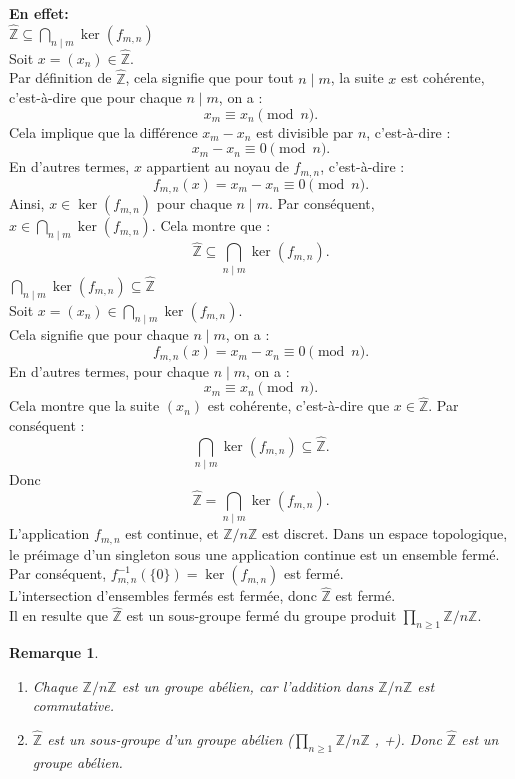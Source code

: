 \documentclass[a4paper, 14pt]{report}
\newtheorem{remark}{Remarque}[section]
\begin{document}
\begin{onehalfspace}
{\textbf{En effet:}\\
\( \widehat{\mathbb{Z}} \subseteq \bigcap_{n \mid m} \ker(f_{m,n}) \) \\
Soit \( x = (x_n) \in \widehat{\mathbb{Z}} \).\\
Par définition de \( \widehat{\mathbb{Z}} \), cela signifie que pour tout \( n \mid m \), la suite \( x \) est cohérente, c'est-à-dire que pour chaque \( n \mid m \), on a :
\[
x_m \equiv x_n \pmod{n}.
\]
Cela implique que la différence \( x_m - x_n \) est divisible par \( n \), c'est-à-dire :
\[
x_m - x_n \equiv 0 \pmod{n}.
\]
En d'autres termes, \( x \) appartient au noyau de \( f_{m,n} \), c'est-à-dire :
\[
f_{m,n}(x) = x_m - x_n \equiv 0 \pmod{n}.
\]
Ainsi, \( x \in \ker(f_{m,n}) \) pour chaque \( n \mid m \). Par conséquent, \( x \in \bigcap_{n \mid m} \ker(f_{m,n}) \). Cela montre que :
\[
\widehat{\mathbb{Z}} \subseteq \bigcap_{n \mid m} \ker(f_{m,n}).
\]
\( \bigcap_{n \mid m} \ker(f_{m,n}) \subseteq \widehat{\mathbb{Z}} \) \\
Soit \( x = (x_n) \in \bigcap_{n \mid m} \ker(f_{m,n}) \).\\
 Cela signifie que pour chaque \( n \mid m \), on a :
\[
f_{m,n}(x) = x_m - x_n \equiv 0 \pmod{n}.
\]
En d'autres termes, pour chaque \( n \mid m \), on a :
\[
x_m \equiv x_n \pmod{n}.
\]
Cela montre que la suite \( (x_n) \) est cohérente, c'est-à-dire que \( x \in \widehat{\mathbb{Z}} \). Par conséquent :
\[
\bigcap_{n \mid m} \ker(f_{m,n}) \subseteq \widehat{\mathbb{Z}}.
\]
Donc 
\[
\widehat{\mathbb{Z}} = \bigcap_{n \mid m} \ker(f_{m,n}).
\]
L'application \(f_{m,n}\) est continue, et \(\mathbb{Z}/n\mathbb{Z}\) est discret. Dans un espace topologique, le préimage d'un singleton sous une application continue est un ensemble fermé. Par conséquent, \(f_{m,n}^{-1}(\{0\}) = \ker(f_{m,n})\) est fermé.\\
L'intersection d'ensembles fermés est fermée, donc \( \widehat{\mathbb{Z}} \) est fermé.\\
Il en resulte que \( \widehat{\mathbb{Z}} \) est un sous-groupe fermé du groupe produit \(\prod_{n \geq 1} \mathbb{Z}/n\mathbb{Z}\).

\begin{remark} \cite{schaub1997}
	\begin{enumerate} [label=\roman*)] 
		\item Chaque \( \mathbb{Z}/n\mathbb{Z} \) est un groupe abélien, car l'addition dans \( \mathbb{Z}/n\mathbb{Z} \) est commutative.
		\item \( \widehat{\mathbb{Z}} \) est un sous-groupe d'un groupe abélien (\(\prod_{n \geq 1} \mathbb{Z}/n\mathbb{Z}\) , +). Donc \( \widehat{\mathbb{Z}} \) est un groupe abélien.
	\end{enumerate}
\end{remark}


}
\end{onehalfspace}
\end{document}
